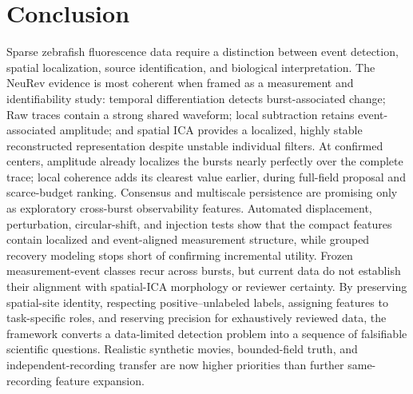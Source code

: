 \section{Conclusion}
\label{sec:conclusion}

Sparse zebrafish fluorescence data require a distinction between event detection, spatial localization, source identification, and biological interpretation. The NeuRev evidence is most coherent when framed as a measurement and identifiability study: temporal differentiation detects burst-associated change; Raw traces contain a strong shared waveform; local subtraction retains event-associated amplitude; and spatial ICA provides a localized, highly stable reconstructed representation despite unstable individual filters. At confirmed centers, amplitude already localizes the bursts nearly perfectly over the complete trace; local coherence adds its clearest value earlier, during full-field proposal and scarce-budget ranking. Consensus and multiscale persistence are promising only as exploratory cross-burst observability features. Automated displacement, perturbation, circular-shift, and injection tests show that the compact features contain localized and event-aligned measurement structure, while grouped recovery modeling stops short of confirming incremental utility. Frozen measurement-event classes recur across bursts, but current data do not establish their alignment with spatial-ICA morphology or reviewer certainty. By preserving spatial-site identity, respecting positive--unlabeled labels, assigning features to task-specific roles, and reserving precision for exhaustively reviewed data, the framework converts a data-limited detection problem into a sequence of falsifiable scientific questions. Realistic synthetic movies, bounded-field truth, and independent-recording transfer are now higher priorities than further same-recording feature expansion.
